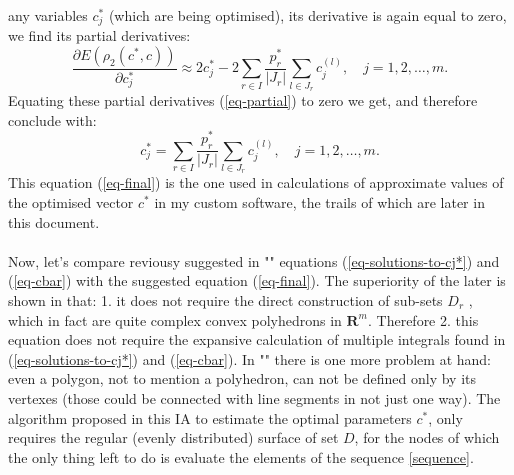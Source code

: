 any variables $c_{j}^{*}$ (which are being optimised), its derivative is again equal to zero, we find its partial derivatives:
\begin{equation}
\frac{\partial E (\rho_{2}(c^{*},c))}{\partial c_{j}^{*}} \approx 2c_{j}^{*} - 2 \sum\limits_{r \in I} \frac{p_{r}^{*}}{\left| J_{r} \right|} \sum\limits_{l \in J_{r}} c_{j}^{(l)}, \quad j=1,2,\dots,m. \label{eq-partial}
\end{equation}
Equating these partial derivatives (\ref{eq-partial}) to zero we get, and therefore conclude with:
\begin{equation}
c_{j}^{*} = \sum\limits_{r \in I} \frac{p_{r}^{*}}{\left| J_{r} \right|} \sum\limits_{l \in J_{r}} c_{j}^{(l)}, \quad j=1,2,\dots,m. \label{eq-final}
\end{equation}
This equation (\ref{eq-final}) is the one used in calculations of approximate values of the optimised vector $c^{*}$ in my custom software, the trails of which are later in this document.\\
\\
Now, let's compare reviousy suggested in "\cite{balk_2010}" equations (\ref{eq-solutions-to-cj*}) and (\ref{eq-cbar}) with the suggested equation (\ref{eq-final}). The superiority of the later is shown in that: 1. it does not require the direct construction of sub-sets $D_{r}$
, which in fact are quite complex convex polyhedrons in $\boldsymbol{R}^{m}$. Therefore 2. this equation does not require the expansive calculation of multiple integrals found in (\ref{eq-solutions-to-cj*}) and (\ref{eq-cbar}).  In "\cite{balk_2010}" there is one more problem at hand: even a polygon, not to mention a polyhedron, can not be defined only by its vertexes (those could be connected with line segments in not just one way). The algorithm proposed in this IA to estimate the optimal parameters $c^{*}$, only requires the regular (evenly distributed) surface of set $D$, for the nodes of which the only thing left to do is evaluate the elements of the sequence  \ref{sequence}.

